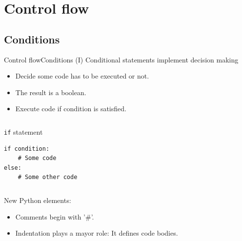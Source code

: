 \documentclass[10pt,compress]{beamer} %
\begin{document}
%		

\section{Control flow}
\subsection{Conditions}

\begin{frame}[fragile]{Control flow}{Conditions (I)}
	Conditional statements implement decision making
	\begin{itemize}
	\item Decide some code has to be executed or not.
	\item The result is a boolean.
	\item Execute code if condition is satisfied.
	\end{itemize}

	\begin{columns}
	\begin{block}{\texttt{if} statement}
		\begin{verbatim}
if condition:
    # Some code
else:
    # Some other code
\end{verbatim}
		\end{block}
	\end{columns}

   New Python elements:
	\begin{itemize}
	\item Comments begin with '\#'.
	\item \alert{Indentation plays a mayor role: It defines code bodies.}
	\end{itemize}
	
\end{frame}
\end{document}

